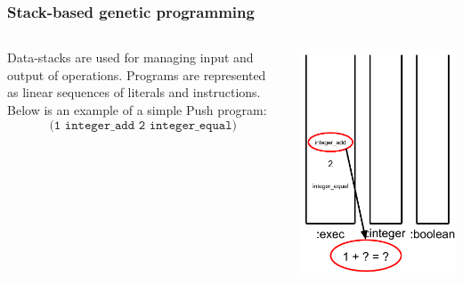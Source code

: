 \documentclass{beamer}
\newcommand{\linespace}{\vskip 0.25cm}
\begin{document}
\begin{frame}
	\frametitle{Stack-based genetic programming}
	\begin{columns}
		\begin{column}{0.65\textwidth}
			Data-stacks are used for managing input and output of operations.
			\linespace
			\linespace
			\linespace
			Programs are represented as linear sequences of literals and instructions. Below is an example of a simple Push program:
			\[\texttt{(1 integer\_add 2 integer\_equal)}\]
		\end{column}
		\begin{column}{0.35\textwidth}
			\includegraphics[height=.7\textheight]{Illustrations/stack_3_6.PDF}
		\end{column}
	\end{columns}
\end{frame}
\end{document}
